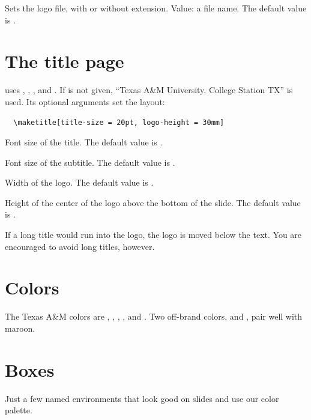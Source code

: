 \documentclass{l3doc}
\begin{document}
\begin{documentation}
Sets the logo file, with or without extension.
Value: a file name. The default value is .

\section{The title page}

 uses , , , 
and . If  is not given, \enquote{Texas A\&M University,
College Station TX} is used. Its optional arguments set the layout:
\begin{verbatim}
  \maketitle[title-size = 20pt, logo-height = 30mm]
\end{verbatim}

Font size of the title. The default value is \opt{18pt}.

Font size of the subtitle. The default value is \opt{11pt}.

Width of the logo. The default value is .

Height of the center of the logo above the bottom
of the slide. The default value is \opt{28mm}.

\medskip\noindent
If a long title would run into the logo, the logo is moved below the text.
You are encouraged to avoid long titles, however.

\section{Colors}

{\raggedright
The Texas A\&M colors are , , ,
,  and . Two off-brand
colors,  and , pair well with maroon.\par}

\section{Boxes}

Just a few named  environments that look good on slides and
use our color palette.


\end{documentation}
\end{document}
